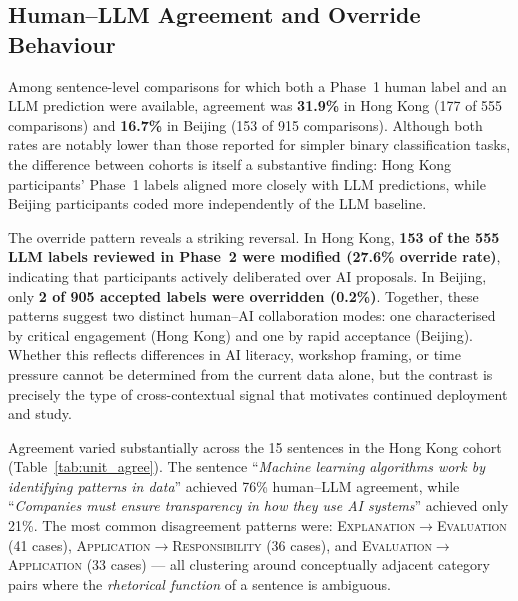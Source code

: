 \documentclass[fleqn,10pt]{JLA_article}
\begin{document}
\subsection{Human--LLM Agreement and Override Behaviour}

Among sentence-level comparisons for which both a Phase~1 human label and an LLM
prediction were available, agreement was \textbf{31.9\%} in Hong Kong (177 of 555
comparisons) and \textbf{16.7\%} in Beijing (153 of 915 comparisons). Although both
rates are notably lower than those reported for simpler binary classification tasks,
the difference between cohorts is itself a substantive finding: Hong Kong participants'
Phase~1 labels aligned more closely with LLM predictions, while Beijing participants
coded more independently of the LLM baseline.

The override pattern reveals a striking reversal. In Hong Kong, \textbf{153 of the 555
LLM labels reviewed in Phase~2 were modified (27.6\% override rate)}, indicating that
participants actively deliberated over AI proposals. In Beijing, only \textbf{2 of 905
accepted labels were overridden (0.2\%)}. Together, these patterns suggest two distinct
human--AI collaboration modes: one characterised by critical engagement (Hong Kong) and
one by rapid acceptance (Beijing). Whether this reflects differences in AI literacy,
workshop framing, or time pressure cannot be determined from the current data alone,
but the contrast is precisely the type of cross-contextual signal that motivates
continued deployment and study.

Agreement varied substantially across the 15 sentences in the Hong Kong cohort
(Table~\ref{tab:unit_agree}). The sentence ``\emph{Machine learning algorithms work by
identifying patterns in data}'' achieved 76\% human--LLM agreement, while
``\emph{Companies must ensure transparency in how they use AI systems}'' achieved only 21\%.
The most common disagreement patterns were:
\textsc{Explanation}$\to$\textsc{Evaluation} (41 cases),
\textsc{Application}$\to$\textsc{Responsibility} (36 cases), and
\textsc{Evaluation}$\to$\textsc{Application} (33 cases) — all clustering around
conceptually adjacent category pairs where the \emph{rhetorical function} of a sentence
is ambiguous.
\end{document}
